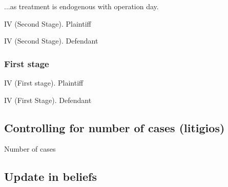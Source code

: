 \documentclass[12pt]{article}
\theoremstyle{named}
\newcommand{\folder}{C:/Users/chasi_000/Dropbox/Statistics/P10/Results/Results_2/Effect}
\begin{document}
...as treatment is endogenous with operation day.


\begin{table}[H]\centering \caption{IV (Second Stage). Plaintiff}
\begin{center}
\scriptsize{}
\end{center}
\end{table}
\begin{table}[H]\centering \caption{IV (Second Stage). Defendant}
\begin{center}
\scriptsize{}
\end{center}
\end{table}


\subsubsection*{First stage}


\begin{table}[H]\centering \caption{IV (First stage). Plaintiff}
\begin{center}
\scriptsize{}
\end{center}
\end{table}
\begin{table}[H]\centering \caption{IV (First Stage). Defendant}
\begin{center}
\scriptsize{}
\end{center}
\end{table}


\subsection*{Controlling for number of cases (litigios) }



\begin{table}[H]\centering \caption{Number of cases}
\begin{center}
\scriptsize{}
\end{center}
\end{table}


\pagebreak


\subsection*{Update in beliefs}
\end{document}
